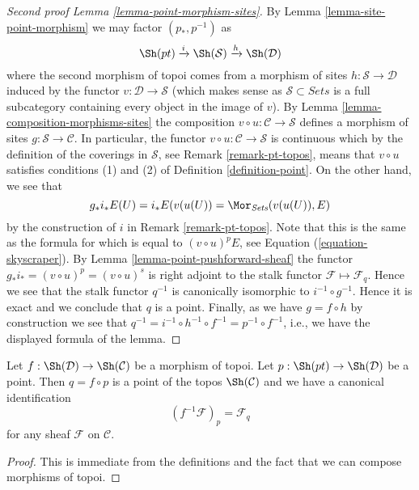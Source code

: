 \begin{proof}[Second proof Lemma \ref{lemma-point-morphism-sites}]
By
Lemma \ref{lemma-site-point-morphism}
we may factor $(p_*, p^{-1})$ as
$$
\Sh(pt) \xrightarrow{i} \Sh(\mathcal{S})
\xrightarrow{h} \Sh(\mathcal{D})
$$
where the second morphism of topoi comes from a morphism of sites
$h : \mathcal{S} \to \mathcal{D}$ induced by the functor
$v : \mathcal{D} \to \mathcal{S}$ (which makes sense as
$\mathcal{S} \subset \textit{Sets}$ is a full subcategory containing
every object in the image of $v$). By
Lemma \ref{lemma-composition-morphisms-sites}
the composition $v \circ u : \mathcal{C} \to \mathcal{S}$
defines a morphism of sites $g : \mathcal{S} \to \mathcal{C}$.
In particular, the functor
$v \circ u : \mathcal{C} \to \mathcal{S}$
is continuous which by the definition of the coverings
in $\mathcal{S}$, see
Remark \ref{remark-pt-topos},
means that $v \circ u$ satisfies conditions (1) and (2) of
Definition \ref{definition-point}.
On the other hand, we see that
$$
g_*i_*E(U) = i_*E(v(u(U)) = \Mor_{\textit{Sets}}(v(u(U)), E)
$$
by the construction of $i$ in
Remark \ref{remark-pt-topos}.
Note that this is the same as the formula for
which is equal to $(v \circ u)^pE$, see
Equation (\ref{equation-skyscraper}).
By
Lemma \ref{lemma-point-pushforward-sheaf}
the functor $g_*i_* = (v \circ u)^p = (v \circ u)^s$
is right adjoint to the stalk functor
$\mathcal{F} \mapsto \mathcal{F}_q$.
Hence we see that the stalk functor $q^{-1}$ is canonically
isomorphic to $i^{-1} \circ g^{-1}$. Hence it is exact and
we conclude that $q$ is a point. Finally, as we have
$g = f \circ h$ by construction we see that
$q^{-1} = i^{-1} \circ h^{-1} \circ f^{-1} = p^{-1} \circ f^{-1}$,
i.e., we have the displayed formula of the lemma.
\end{proof}

\begin{lemma}
\label{lemma-point-morphism-topoi}
Let $f : \Sh(\mathcal{D}) \to \Sh(\mathcal{C})$
be a morphism of topoi. Let $p : \Sh(pt) \to \Sh(\mathcal{D})$
be a point. Then $q = f \circ p$ is a point of the topos
$\Sh(\mathcal{C})$ and we have
a canonical identification
$$
(f^{-1}\mathcal{F})_p = \mathcal{F}_q
$$
for any sheaf $\mathcal{F}$ on $\mathcal{C}$.
\end{lemma}

\begin{proof}
This is immediate from the definitions and the fact that we can
compose morphisms of topoi.
\end{proof}





